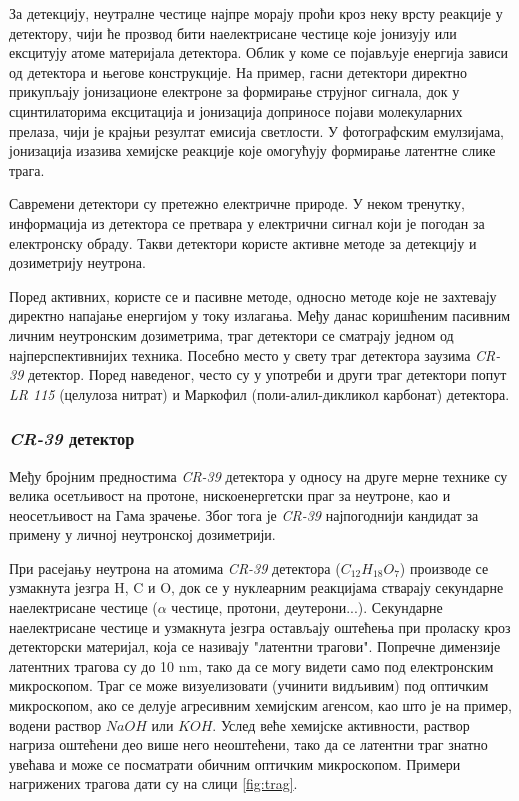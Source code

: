 \documentclass[11pt,a4paper,serbian,oneside]{book}
\begin{document}
За детекцију, неутралне честице најпре морају проћи кроз неку врсту реакције у де\-тек\-то\-ру, чији ће прозвод бити наелектрисане честице које јонизују или ексцитују атоме материјала детектора. Облик у коме се појављује енергија зависи од детектора и његове конструкције.  На пример, гасни детектори директно прикупљају јонизационе електроне за формирање струјног сигнала, док у сцинтилаторима  ексцитација и јонизација доприносе појави молекуларних прелаза, чији је крајњи резултат емисија светлости. У фотографским емулзијама, јонизација изазива хемијске реакције које омогућују формирање латентне слике трага.

Савремени детектори су претежно електричне природе. У неком тренутку, информација из детектора се претвара у електрични сигнал који је погодан за електронску обраду. Такви детектори користе активне методе за детекцију и дозиметрију неутрона. 

Поред активних, користе се и пасивне методе, односно методе које не захтевају директно напајање енергијом у току излагања.  Међу данас коришћеним пасивним личним не\-ут\-рон\-ским дозиметрима, траг детектори се сматрају једном од најперспективнијих техника. Посебно место у свету траг детектора заузима \textit{CR-39} детектор. Поред наведеног, често су у употреби и други траг детектори попут \textit{LR 115} (целулоза нитрат) и Маркофил (поли-алил-дикликол карбонат) детектора. 

\subsubsection{\textit{CR-39} детектор}

Међу бројним предностима \textit{CR-39} детектора у односу на друге мерне технике су велика осетљивост на протоне, нискоенергетски праг за неутроне, као и неосетљивост на Гама зрачење. Због тога је \textit{CR-39} најпогоднији кандидат за примену у личној неутронској дозиметрији.

При расејању неутрона на атомима \textit{CR-39} детектора ($C_{12}H_{18}O_{7}$) производе се
узмакнута језгра H, C и O, док се у нуклеарним реакцијама стварају секундарне
наелектрисане честице ($\alpha$ честице, протони, деутерони...). Секундарне наелектрисане честице и узмакнута језгра остављају оштећења при проласку кроз детекторски материјал, која се називају "латентни трагови". Попречне димензије латентних трагова су до 10 nm, тако да се могу видети само под електронским микроскопом. Траг се може визуелизовати (учинити видљивим) под оптичким микроскопом, ако се делује агресивним хемијским агенсом, као што је на пример, водени раствор $NaOH$ или $KOH$. Услед веће хемијске активности, раствор нагриза оштећени део више него неоштећени, тако да се латентни траг знатно увећава и може се посматрати обичним оптичким микроскопом. Примери нагрижених трагова дати су на слици \ref{fig:trag}.
\end{document}
